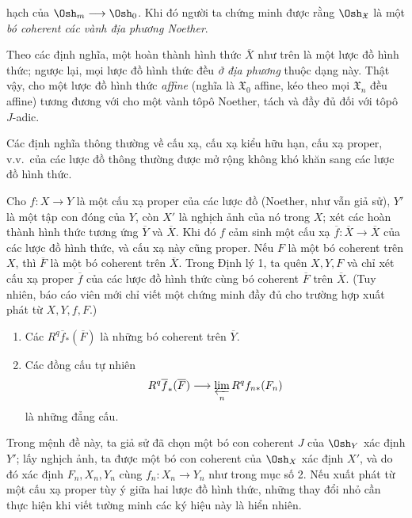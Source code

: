 hạch của $\Osh_m\longrightarrow\Osh_0$. Khi đó người ta chứng minh được rằng
$\Osh_{\mathfrak X}$ là một \emph{bó coherent các vành địa phương Noether}.

Theo các định nghĩa, một hoàn thành hình thức $\overline X$ như trên là một
lược đồ hình thức; ngược lại, mọi lược đồ hình thức đều \emph{ở địa phương}
thuộc dạng này. Thật vậy, cho một lược đồ hình thức \emph{affine} (nghĩa là
$\mathfrak X_0$ affine, kéo theo mọi $\mathfrak X_n$ đều affine) tương đương
với cho một vành tôpô Noether, tách và đầy đủ đối với tôpô $J$-adic.

Các định nghĩa thông thường về cấu xạ, cấu xạ kiểu hữu hạn, cấu xạ proper,
v.v.\ của các lược đồ thông thường được mở rộng không khó khăn sang các lược
đồ hình thức.


Cho $f:X\longrightarrow Y$ là một cấu xạ proper của các lược đồ (Noether, như
vẫn giả sử), $Y'$ là một tập con đóng của $Y$, còn $X'$ là nghịch ảnh của nó
trong $X$; xét các hoàn thành hình thức tương ứng $\overline Y$ và
$\overline X$. Khi đó $f$ cảm sinh một cấu xạ
$\overline f:\overline X\longrightarrow\overline X$ của các lược đồ hình thức,
và cấu xạ này cũng proper. Nếu $F$ là một bó coherent trên $X$, thì
$\overline F$ là một bó coherent trên $\overline X$. Trong Định lý 1, ta quên
$X,Y,F$ và chỉ xét cấu xạ proper $\overline f$ của các lược đồ hình thức cùng
bó coherent $\overline F$ trên $\overline X$. (Tuy nhiên, báo cáo viên mới chỉ
viết một chứng minh đầy đủ cho trường hợp xuất phát từ $X,Y,f,F$.)

\begin{enumerate}
  \item[\textit{i.}] Các $R^{q}\overline f_{*}(\overline F)$ là những bó
    coherent trên $\overline Y$.
  \item[\textit{ii.}] Các đồng cấu tự nhiên
    \[
      R^{q}\overline f_{*}(\overline F)
      \longrightarrow \varprojlim_n R^{q}f_{n*}(F_n)
    \]
    là những đẳng cấu.
\end{enumerate}

Trong mệnh đề này, ta giả sử đã chọn một bó con coherent $J$ của $\Osh_Y$ xác
định $Y'$; lấy nghịch ảnh, ta được một bó con coherent của $\Osh_X$ xác định
$X'$, và do đó xác định $F_n,X_n,Y_n$ cùng
$f_n:X_n\longrightarrow Y_n$ như trong mục số 2. Nếu xuất phát từ một cấu xạ
proper tùy ý giữa hai lược đồ hình thức, những thay đổi nhỏ cần thực hiện khi
viết tường minh các ký hiệu này là hiển nhiên.

